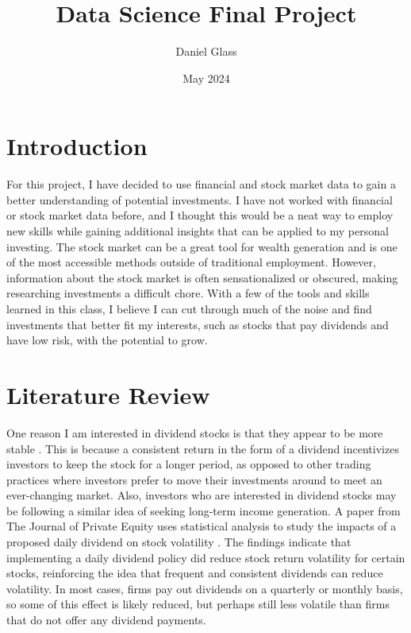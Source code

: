 \documentclass[12pt]{article}
\title{Data Science Final Project}
\author{Daniel Glass}
\date{May 2024}
\begin{document}
\maketitle

\section{Introduction}

For this project, I have decided to use financial and stock market data to gain a better understanding of potential investments. I have not worked with financial or stock market data before, and I thought this would be a neat way to employ new skills while gaining additional insights that can be applied to my personal investing. The stock market can be a great tool for wealth generation and is one of the most accessible methods outside of traditional employment. However, information about the stock market is often sensationalized or obscured, making researching investments a difficult chore. With a few of the tools and skills learned in this class, I believe I can cut through much of the noise and find investments that better fit my interests, such as stocks that pay dividends and have low risk, with the potential to grow.

\section{Literature Review}

One reason I am interested in dividend stocks is that they appear to be more stable \citep{Siddikee2018}. This is because a consistent return in the form of a dividend incentivizes investors to keep the stock for a longer period, as opposed to other trading practices where investors prefer to move their investments around to meet an ever-changing market. Also, investors who are interested in dividend stocks may be following a similar idea of seeking long-term income generation. A paper from The Journal of Private Equity uses statistical analysis to study the impacts of a proposed daily dividend on stock volatility \citep{Siddikee2018}. The findings indicate that implementing a daily dividend policy did reduce stock return volatility for certain stocks, reinforcing the idea that frequent and consistent dividends can reduce volatility. In most cases, firms pay out dividends on a quarterly or monthly basis, so some of this effect is likely reduced, but perhaps still less volatile than firms that do not offer any dividend payments.
\end{document}
